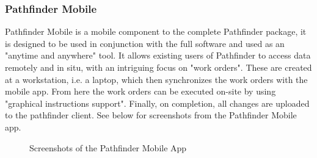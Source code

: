 \documentclass [11pt,a4paper]{article}
\begin{document}
\subsubsection{Pathfinder Mobile}
\label{sec:pathfinder}

Pathfinder Mobile is a mobile component to the complete Pathfinder package, it is designed to be used in conjunction with the full software and used as an "anytime and anywhere" \cite{PathfinderMobile} tool. It allows existing users of Pathfinder to access data remotely and in situ, with an intriguing focus on "work orders". These are created at a workstation, i.e. a laptop, which then synchronizes the work orders with the mobile app. From here the work orders can be executed on-site by using "graphical instructions support"\cite{Pathfinder}. Finally, on completion, all changes are uploaded to the pathfinder client. See below for screenshots from the Pathfinder Mobile app.

\begin{figure}[H]%
    \centering
    \qquad
    \caption{Screenshots of the Pathfinder Mobile App}%
    \label{fig:pathfinder_screenshots}%
\end{figure}
\end{document}
